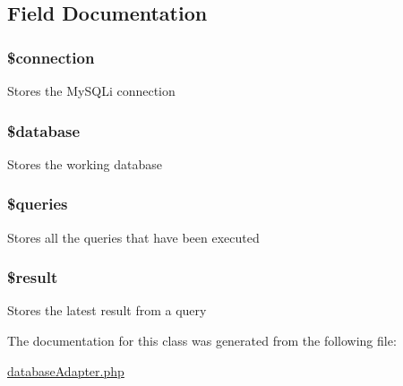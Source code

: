 \subsection{Field Documentation}
\hypertarget{class_my_s_q_li_database_a0d9c79b9b86b3f5891c6d3892f12c6a0}{
\subsubsection[{\$connection}]{\setlength{\rightskip}{0pt plus 5cm}\$connection}}
\label{class_my_s_q_li_database_a0d9c79b9b86b3f5891c6d3892f12c6a0}
Stores the MySQLi connection \hypertarget{class_my_s_q_li_database_a7691c0162d89de0b6ba47edcd8ba8878}{
\subsubsection[{\$database}]{\setlength{\rightskip}{0pt plus 5cm}\$database}}
\label{class_my_s_q_li_database_a7691c0162d89de0b6ba47edcd8ba8878}
Stores the working database \hypertarget{class_my_s_q_li_database_a576b05de2f452e4cce4e3de12667ba0f}{
\subsubsection[{\$queries}]{\setlength{\rightskip}{0pt plus 5cm}\$queries}}
\label{class_my_s_q_li_database_a576b05de2f452e4cce4e3de12667ba0f}
Stores all the queries that have been executed \hypertarget{class_my_s_q_li_database_a112ef069ddc0454086e3d1e6d8d55d07}{
\subsubsection[{\$result}]{\setlength{\rightskip}{0pt plus 5cm}\$result}}
\label{class_my_s_q_li_database_a112ef069ddc0454086e3d1e6d8d55d07}
Stores the latest result from a query 

The documentation for this class was generated from the following file:\begin{DoxyCompactItemize}
\item 
\hyperlink{database_adapter_8php}{databaseAdapter.php}\end{DoxyCompactItemize}
